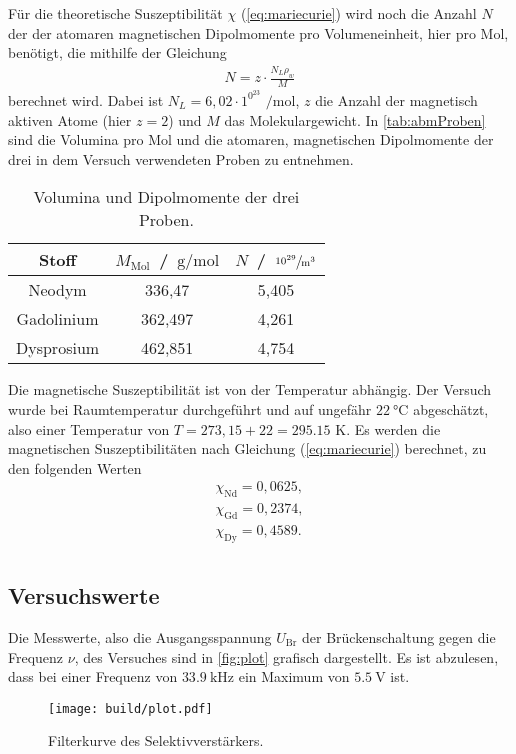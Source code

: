 \noindent
Für die theoretische Suszeptibilität $\chi$ (\ref{eq:mariecurie}) wird noch die Anzahl $N$ der der atomaren magnetischen Dipolmomente pro Volumeneinheit, hier pro Mol, benötigt, die mithilfe der Gleichung 
\begin{align*}
  N = z\cdot \frac{N_L \rho_w}{M}
\end{align*}
berechnet wird. Dabei ist $N_L = 6,02 \cdot 1^0^{23}$ $\si{\per\mole}$, $z$ die Anzahl der magnetisch aktiven Atome (hier $z=2$) und $M$ das Molekulargewicht.
In \autoref{tab:abmProben} sind die Volumina pro Mol und die atomaren, magnetischen Dipolmomente der drei in dem Versuch verwendeten Proben zu entnehmen.
\begin{table}[H]
  \centering
  \caption{Volumina und Dipolmomente der drei Proben.}
  \label{tab:abmProben}
  \begin{tabular}{c|c c}
    \toprule
    Stoff & $M_{\text{Mol}}$ \,/\, $\si{\gram\per\mole}$ & $N$ \,/\, $\sfrac{10^{29}}{\si{\cubic\meter}}$ \\
    \midrule
    Neodym & 336,47 & 5,405 \\
    Gadolinium & 362,497 & 4,261 \\
    Dysprosium & 462,851 & 4,754 \\
    \bottomrule
  \end{tabular}
\end{table}

\noindent
Die magnetische Suszeptibilität ist von der Temperatur abhängig. Der Versuch wurde bei Raumtemperatur durchgeführt und auf ungefähr $\SI{22}{\degreeCelsius}$ abgeschätzt, also einer Temperatur von $T = 273,15 + 22 = 295.15$ K.
Es werden die magnetischen Suszeptibilitäten nach Gleichung (\ref{eq:mariecurie}) berechnet, zu den folgenden Werten
\begin{align*}
  \chi_{\text{Nd}} = 0,0625,  \\
  \chi_{\text{Gd}} = 0,2374, \\
  \chi_{\text{Dy}} = 0,4589. \\
\end{align*}






\subsection{Versuchswerte}
\label{subsec:versuchsW}
Die Messwerte, also die Ausgangsspannung $U_{\text{Br}}$ der Brückenschaltung gegen die Frequenz $\nu$, des Versuches sind in \autoref{fig:plot} grafisch dargestellt.
Es ist abzulesen, dass bei einer Frequenz von $\SI{33,9}{\kilo\hertz}$ ein Maximum von $\SI{5,5}{\volt}$ ist. 
\begin{figure}[H]
  \centering
  \texttt{[image: build/plot.pdf]}
  \caption{Filterkurve des Selektivverstärkers.}
  \label{fig:plot}
\end{figure}

